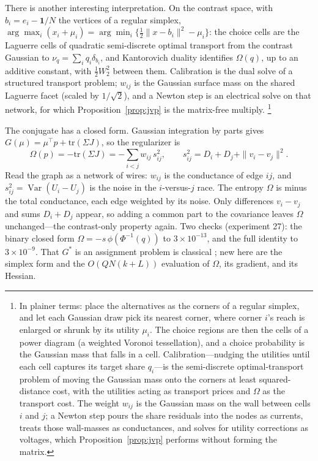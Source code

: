 \documentclass[12pt]{article}
\theoremstyle{remark}
\begin{document}
There is another interesting interpretation. On the contrast space, with $b_i = e_i - \mathbf{1}/N$ the vertices of
a regular simplex, $\arg\max_i (x_i + \mu_i) = \arg\min_i
\{\tfrac12 \|x - b_i\|^2 - \mu_i\}$: the choice cells are the
Laguerre cells of quadratic semi-discrete optimal transport from the
contrast Gaussian to $\nu_q = \sum_i q_i \delta_{b_i}$, and
Kantorovich duality identifies $\Omega(q)$, up to an additive constant,
with $\tfrac12 W_2^2$ between them. Calibration is the dual solve of a
structured transport problem; $w_{ij}$ is the Gaussian surface mass on
the shared Laguerre facet (scaled by $1/\sqrt2$), and a Newton step is
an electrical solve on that network, for which
Proposition~\ref{prop:jvp} is the matrix-free multiply.%
\footnote{In plainer terms: place the alternatives as the corners of a
regular simplex, and let each Gaussian draw pick its nearest corner,
where corner $i$'s reach is enlarged or shrunk by its utility $\mu_i$.
The choice regions are then the cells of a power diagram (a weighted
Voronoi tessellation), and a choice probability is the Gaussian mass
that falls in a cell. Calibration---nudging the utilities until each
cell captures its target share $q_i$---is the semi-discrete
optimal-transport problem of moving the Gaussian mass onto the corners
at least squared-distance cost, with the utilities acting as transport
prices and $\Omega$ as the transport cost. The weight $w_{ij}$ is the
Gaussian mass on the wall between cells $i$ and $j$; a Newton step pours
the share residuals into the nodes as currents, treats those
wall-masses as conductances, and solves for utility corrections as
voltages, which Proposition~\ref{prop:jvp} performs without forming the
matrix.}

The conjugate has a closed form. Gaussian integration by parts gives
$G(\mu) = \mu^\top p + \mathrm{tr}(\Sigma J)$, so the regularizer is
\[
\Omega(p) = -\mathrm{tr}(\Sigma J)
= -\sum_{i<j} w_{ij}\, s_{ij}^2, \qquad
s_{ij}^2 = D_i + D_j + \|v_i - v_j\|^2 .
\]
Read the graph as a network of wires: $w_{ij}$ is the conductance of
edge $ij$, and $s_{ij}^2 = \operatorname{Var}(U_i - U_j)$ is the noise in the
$i$-versus-$j$ race. The entropy $\Omega$ is minus the total
conductance, each edge weighted by its noise. Only differences $v_i -
v_j$ and sums $D_i + D_j$ appear, so adding a common part to the
covariance leaves $\Omega$ unchanged---the contrast-only property
again. Two checks (experiment 27): the binary closed form
$\Omega = -s\,\phi(\Phi^{-1}(q))$ to $3\times10^{-13}$, and the full
identity to $3\times10^{-9}$. That $G^*$ is an assignment problem is
classical \citep{chiong2016}; new here are the simplex form and the
$O(QN(k+L))$ evaluation of $\Omega$, its gradient, and its Hessian.
\end{document}

